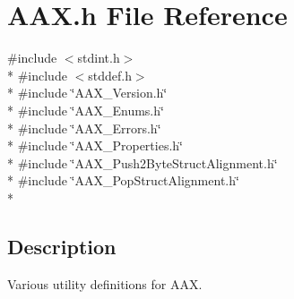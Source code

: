 \hypertarget{a00149}{}\section{A\+A\+X.\+h File Reference}
\label{a00149}
{\ttfamily \#include $<$stdint.\+h$>$}\\*
{\ttfamily \#include $<$stddef.\+h$>$}\\*
{\ttfamily \#include \char`\"{}A\+A\+X\+\_\+\+Version.\+h\char`\"{}}\\*
{\ttfamily \#include \char`\"{}A\+A\+X\+\_\+\+Enums.\+h\char`\"{}}\\*
{\ttfamily \#include \char`\"{}A\+A\+X\+\_\+\+Errors.\+h\char`\"{}}\\*
{\ttfamily \#include \char`\"{}A\+A\+X\+\_\+\+Properties.\+h\char`\"{}}\\*
{\ttfamily \#include \char`\"{}A\+A\+X\+\_\+\+Push2\+Byte\+Struct\+Alignment.\+h\char`\"{}}\\*
{\ttfamily \#include \char`\"{}A\+A\+X\+\_\+\+Pop\+Struct\+Alignment.\+h\char`\"{}}\\*


\subsection{Description}
Various utility definitions for A\+A\+X. 

